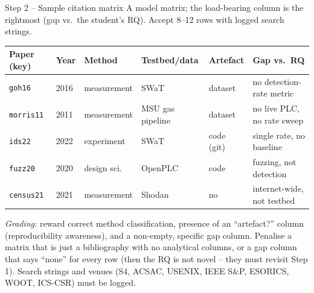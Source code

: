 \documentclass[11pt,a4paper]{article}
\begin{document}
\begin{solutionbox}{Step 2 -- Sample citation matrix}
A model matrix; the load-bearing column is the rightmost (gap vs.\ the
student's RQ). Accept 8--12 rows with logged search strings.

\vspace{2pt}
{\footnotesize
\begin{tabular}{@{}p{2.4cm}p{0.9cm}p{2.0cm}p{2.6cm}p{1.5cm}p{3.2cm}@{}}
\toprule
\textbf{Paper (key)} & \textbf{Year} & \textbf{Method} & \textbf{Testbed/data} & \textbf{Artefact} & \textbf{Gap vs.\ RQ} \\
\midrule
\texttt{goh16}    & 2016 & measurement & SWaT             & dataset    & no detection-rate metric \\
\texttt{morris11} & 2011 & measurement & MSU gas pipeline & dataset    & no live PLC, no rate sweep \\
\texttt{ids22}    & 2022 & experiment  & SWaT             & code (git) & single rate, no baseline \\
\texttt{fuzz20}   & 2020 & design sci. & OpenPLC          & code       & fuzzing, not detection \\
\texttt{census21} & 2021 & measurement & Shodan           & no         & internet-wide, not testbed \\
\bottomrule
\end{tabular}}

\vspace{1mm}
\emph{Grading:} reward correct method classification, presence of an
``artefact?'' column (reproducibility awareness), and a non-empty,
specific gap column. Penalise a matrix that is just a bibliography with
no analytical columns, or a gap column that says ``none'' for every row
(then the RQ is not novel -- they must revisit Step 1). Search strings
and venues (S4, ACSAC, USENIX, IEEE S\&P, ESORICS, WOOT, ICS-CSR) must
be logged.
\end{solutionbox}
\end{document}

